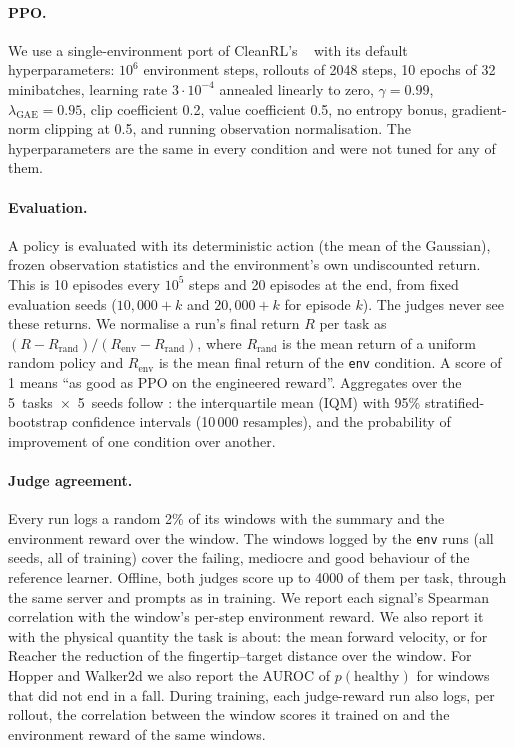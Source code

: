 \paragraph{PPO.} We use a single-environment port of CleanRL's ~\cite{huang2022cleanrl,
schulman2017ppo} with its default hyperparameters: $10^6$ environment steps, rollouts of 2048 steps, 10 epochs of 32
minibatches, learning rate $3\cdot10^{-4}$ annealed linearly to zero, $\gamma=0.99$, $\lambda_{\text{GAE}}=0.95$, clip
coefficient 0.2, value coefficient 0.5, no entropy bonus, gradient-norm clipping at 0.5, and running observation
normalisation. The hyperparameters are the same in every condition and were not tuned for any of them.

\paragraph{Evaluation.} A policy is evaluated with its deterministic action (the mean of the Gaussian), frozen
observation statistics and the environment's own undiscounted return. This is 10 episodes every $10^5$ steps and 20
episodes at the end, from fixed evaluation seeds ($10,000+k$ and $20,000+k$ for episode $k$). The judges never see these returns. We
normalise a run's final return $R$ per task as $(R-R_{\text{rand}})/(R_{\text{env}}-R_{\text{rand}})$, where
$R_{\text{rand}}$ is the mean return of a uniform random policy and $R_{\text{env}}$ is the mean final return of the
\texttt{env} condition. A score of 1 means ``as good as PPO on the engineered reward''. Aggregates over the
5~tasks~$\times$~5~seeds follow \citet{agarwal2021deep}: the interquartile mean (IQM) with 95\% stratified-bootstrap
confidence intervals (10\,000 resamples), and the probability of improvement of one condition over another.

\paragraph{Judge agreement.} Every run logs a random 2\% of its windows with the summary and the environment reward
over the window. The windows logged by the \texttt{env} runs (all seeds, all of training) cover the failing, mediocre
and good behaviour of the reference learner. Offline, both judges score up to 4000 of them per task, through the same
server and prompts as in training. We report each signal's Spearman correlation with the window's per-step
environment reward. We also report it with the physical quantity the task is about: the mean forward velocity, or for
Reacher the reduction of the fingertip--target distance over the window. For Hopper and Walker2d we also report the AUROC of
$p(\text{healthy})$ for windows that did not end in a fall. During training, each judge-reward run also logs, per
rollout, the correlation between the window scores it trained on and the environment reward of the same windows.

